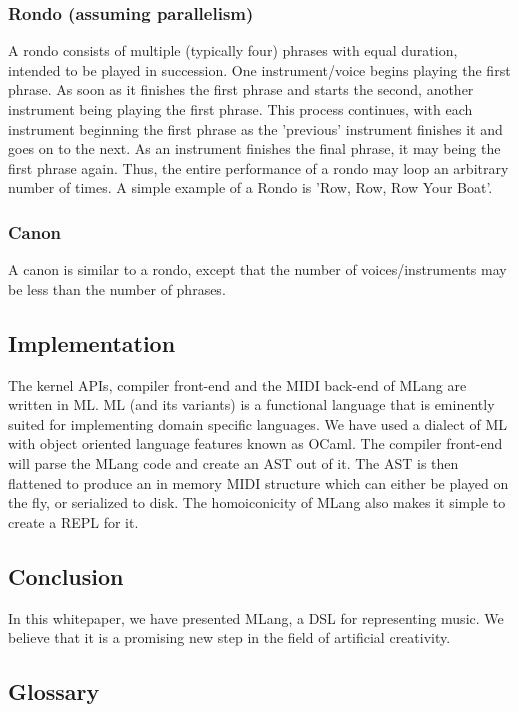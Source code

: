\documentclass{article}
\begin{document}
\subsubsection{Rondo (assuming parallelism)}
A rondo consists of multiple (typically four) phrases with equal duration, intended to be played in succession. One instrument/voice begins playing the first phrase. As soon as it finishes the first phrase and starts the second, another instrument being playing the first phrase. This process continues, with each instrument beginning the first phrase as the 'previous' instrument finishes it and goes on to the next. As an instrument finishes the final phrase, it may being the first phrase again. Thus, the entire performance of a rondo may loop an arbitrary number of times.
A simple example of a Rondo is 'Row, Row, Row Your Boat'.
\subsubsection{Canon}A canon is similar to a rondo, except that the number of voices/instruments may be less than the number of phrases.



\subsection{Implementation}


The kernel APIs, compiler front-end and the MIDI back-end of MLang are written in ML. ML (and its variants) is a functional language that is eminently suited for implementing domain specific languages. We have used a dialect of ML with object oriented language features known as OCaml. The compiler front-end will parse the MLang code and create an AST out of it. The AST is then flattened to produce an in memory MIDI structure which can either be played on the fly, or serialized to disk. The homoiconicity of MLang also makes it simple to create a REPL for it.


\subsection{Conclusion}


In this whitepaper, we have presented MLang, a DSL for representing music. We believe that it is a promising new step in the field of artificial creativity.


\subsection{Glossary}
\end{document}
